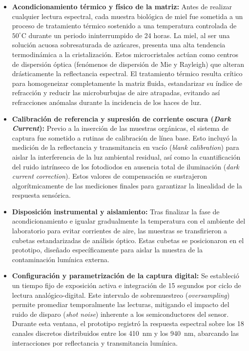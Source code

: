 \begin{itemize}
    \item \textbf{Acondicionamiento térmico y físico de la matriz:} Antes de realizar cualquier lectura espectral, cada muestra biológica de miel fue sometida a un proceso de tratamiento térmico sostenido a una temperatura controlada de $50^\circ\text{C}$ durante un periodo ininterrumpido de 24 horas. La miel, al ser una solución acuosa sobresaturada de azúcares, presenta una alta tendencia termodinámica a la cristalización. Estos microcristales actúan como centros de dispersión óptica (fenómenos de dispersión de Mie y Rayleigh) que alteran drásticamente la reflectancia espectral. El tratamiento térmico resulta crítico para homogeneizar completamente la matriz fluida, estandarizar su índice de refracción y reducir las microburbujas de aire atrapadas, evitando así refracciones anómalas durante la incidencia de los haces de luz.
    
    \item \textbf{Calibración de referencia y supresión de corriente oscura (\textit{Dark Current}):} Previo a la inserción de las muestras orgánicas, el sistema de captura fue sometido a rutinas de calibración de línea base. Esto incluyó la medición de la reflectancia y transmitancia en vacío (\textit{blank calibration}) para aislar la interferencia de la luz ambiental residual, así como la cuantificación del ruido  intrínseco de los fotodiodos en ausencia total de iluminación (\textit{dark current correction}). Estos valores de compensación se sustrajeron algorítmicamente de las mediciones finales para garantizar la linealidad de la respuesta sensórica.
    
    \item \textbf{Disposición instrumental y aislamiento:} Tras finalizar la fase de acondicionamiento e igualar gradualmente la temperatura con el ambiente del laboratorio para evitar corrientes de aire, las muestras se transfirieron a cubetas estandarizadas de análisis óptico. Estas cubetas se posicionaron en el prototipo, diseñado específicamente para aislar la muestra de la contaminación lumínica externa.
    
    \item \textbf{Configuración y parametrización de la captura digital:} Se estableció un tiempo fijo de exposición activa e integración de 15 segundos por ciclo de lectura analógico-digital. Este intervalo de sobremuestreo (\textit{oversampling}) permite promediar temporalmente las lecturas, mitigando el impacto del ruido de disparo (\textit{shot noise}) inherente a los semiconductores del sensor. Durante esta ventana, el prototipo registró la respuesta espectral sobre los 18 canales discretos distribuidos entre los 410~nm y los 940~nm, abarcando las interacciones por reflectancia y transmitancia lumínica.
\end{itemize}

